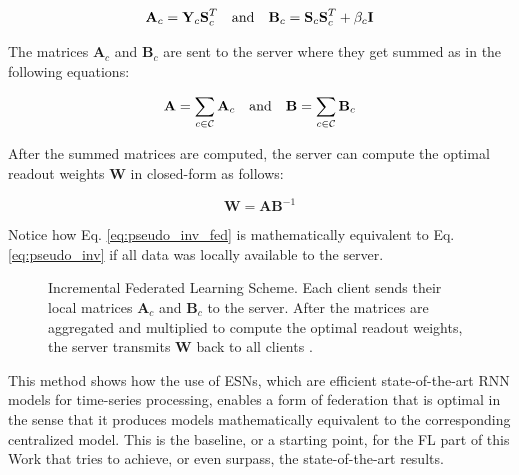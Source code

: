 \begin{equation}
    \textbf{A}_c=\textbf{Y}_c\textbf{S}_c^T\text{\quad and\quad}\textbf{B}_c=\textbf{S}_c\textbf{S}_c^T+\beta_c\textbf{I}
\end{equation}

The matrices $\textbf{A}_c$ and $\textbf{B}_c$ are sent to the server where they get summed as in the following equations:

\begin{equation}
    \textbf{A}=\sum_{c\in\mathcal{C}}\textbf{A}_c\text{\quad and\quad}\textbf{B}=\sum_{c\in\mathcal{C}}\textbf{B}_c
\end{equation}

After the summed matrices are computed, the server can compute the optimal readout weights $\textbf{W}$ in closed-form as follows:

\begin{equation}\label{eq:pseudo_inv_fed}
    \textbf{W}=\textbf{A}\textbf{B}^{-1}
\end{equation}

Notice how Eq. \ref{eq:pseudo_inv_fed} is mathematically equivalent to Eq. \ref{eq:pseudo_inv} if all data was locally available to the server. \\



\begin{figure}[H]\label{fig:incfed}
\centering
{}
\caption{Incremental Federated Learning Scheme. Each client sends their local matrices $\textbf{A}_c$ and $\textbf{B}_c$ to the server. After the matrices are aggregated and multiplied to compute the optimal readout weights, the server transmits $\textbf{W}$ back to all clients \cite{bacciu2021federated}.}
\end{figure}


This method shows how the use of ESNs, which are efficient state-of-the-art RNN models for time-series processing, enables a form of federation that is optimal in the sense that it produces models mathematically equivalent to the corresponding centralized model. This is the baseline, or a starting point, for the FL part of this Work that tries to achieve, or even surpass, the state-of-the-art results.